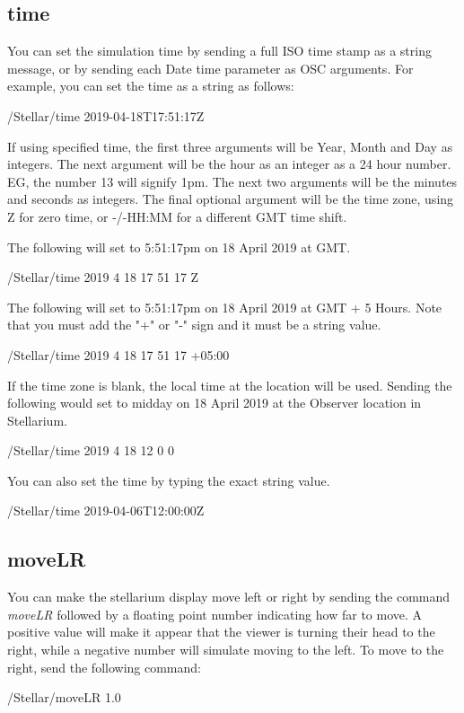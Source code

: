  \subsection{time} 
You can set the simulation time by sending a full ISO time stamp as a string message, or by sending each Date time parameter as OSC arguments. For example, you can set the time as a string as follows:

\begin{syntax}	
	\medskip
	/Stellar/time 2019-04-18T17:51:17Z
	\medskip
\end{syntax}

If using specified time, the first three arguments will be  Year, Month and  Day as integers. The next  argument will be the hour as an integer as a 24 hour number. EG, the number 13 will signify 1pm. The next two arguments will be the minutes and seconds as integers.  The final optional argument will be the time zone, using Z for zero time, or -/-HH:MM for a different GMT time shift.

The following will set to 5:51:17pm on 18 April 2019 at GMT.

\begin{syntax}	
	\medskip
	/Stellar/time 2019 4 18 17 51 17 Z
	\medskip
\end{syntax}

The following will set to 5:51:17pm on 18 April 2019 at GMT + 5 Hours. Note that you must add the "+" or "-" sign and it must be a string value. 
\begin{syntax}	
	\medskip
	/Stellar/time 2019 4 18 17 51 17 +05:00
	\medskip
\end{syntax}

If the time zone is blank, the local time at the location will be used. 
Sending the following would set to midday on 18 April 2019 at the Observer location in Stellarium.

\begin{syntax}	
	\medskip
	/Stellar/time 2019 4 18 12 0 0 
	\medskip
\end{syntax}

You can also set the time by typing the exact string value.
\begin{syntax}	
	\medskip
	/Stellar/time 2019-04-06T12:00:00Z 
	\medskip
\end{syntax}


\subsection{moveLR} 
You can make the stellarium display move left or right by sending the command \textit{moveLR} followed by a floating point number indicating how far to move. A positive value will make it appear that the viewer is turning their head to the right, while a negative number will simulate moving to the left. To move to the right, send the following command:
  \begin{syntax}	
 	\medskip
 	/Stellar/moveLR 1.0
 	\medskip
 \end{syntax}
 \bigskip


